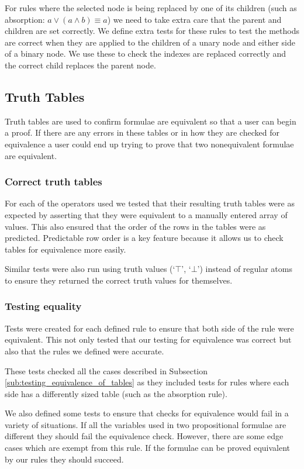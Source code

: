 \documentclass[draft]{report}
\begin{document}
For rules where the selected node is being replaced by one of its children (such as absorption: $a \lor (a \land b) \equiv a$) we need to take extra care that the parent and children are set correctly. We define extra tests for these rules to test the methods are correct when they are applied to the children of a unary node and either side of a binary node. We use these to check the indexes are replaced correctly and the correct child replaces the parent node.

\subsection{Truth Tables}

Truth tables are used to confirm formulae are equivalent so that a user can begin a proof. If there are any errors in these tables or in how they are checked for equivalence a user could end up trying to prove that two nonequivalent formulae are equivalent.

\subsubsection{Correct truth tables}

For each of the operators used we tested that their resulting truth tables were as expected by asserting that they were equivalent to a manually entered array of values. This also ensured that the order of the rows in the tables were as predicted. Predictable row order is a key feature because it allows us to check tables for equivalence more easily.

Similar tests were also run using truth values (`$\top$', `$\bot$') instead of regular atoms to ensure they returned the correct truth values for themselves.

\subsubsection{Testing equality}

Tests were created for each defined rule to ensure that both side of the rule were equivalent. This not only tested that our testing for equivalence was correct but also that the rules we defined were accurate.

These tests checked all the cases described in Subsection \ref{sub:testing_equivalence_of_tables} as they included tests for rules where each side has a differently sized table (such as the absorption rule).

We also defined some tests to ensure that checks for equivalence would fail in a variety of situations. If all the variables used in two propositional formulae are different they should fail the equivalence check. However, there are some edge cases which are exempt from this rule. If the formulae can be proved equivalent by our rules they should succeed. 
\end{document}

